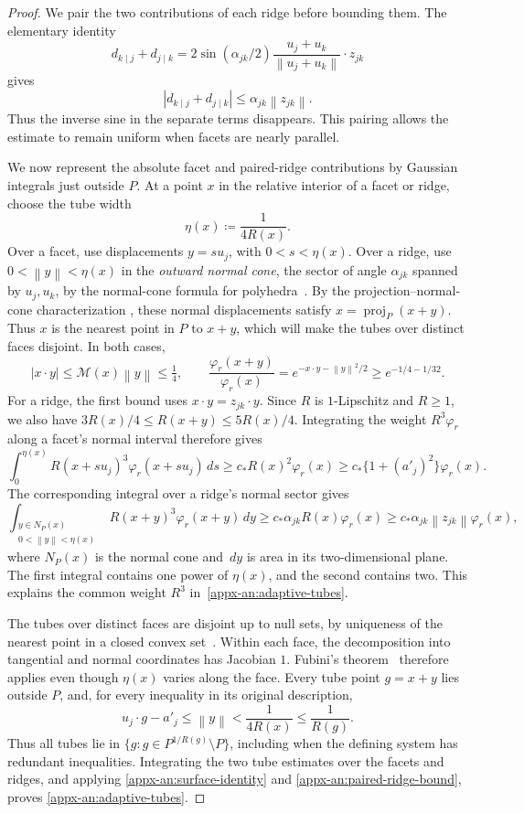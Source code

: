 \documentclass[11pt,letterpaper]{article}
\theoremstyle{remark}
\newcommand{\norm}[1]{\left\lVert#1\right\rVert}
\newcommand{\dd}{\,d}
\begin{document}
\begin{proof}
We pair the two contributions of each ridge before bounding them.
The elementary identity
\[
 d_{k\mid j}+d_{j\mid k}
 =2\sin(\alpha_{jk}/2)
       \frac{u_j+u_k}{\norm{u_j+u_k}}\cdot z_{jk}
\]
gives
\begin{equation}
 |d_{k\mid j}+d_{j\mid k}|\le\alpha_{jk}\norm{z_{jk}}.
 \label{appx-an:paired-ridge-bound}
\end{equation}
Thus the inverse sine in the separate terms disappears. This pairing
allows the estimate to remain uniform when facets are nearly parallel.

We now represent the absolute facet and paired-ridge contributions
by Gaussian integrals just outside \(P\). At a point \(x\) in the
relative interior of a facet or ridge, choose the tube width
\[
 \eta(x)\coloneqq \frac1{4R(x)}.
\]
Over a facet, use displacements \(y=s u_j\), with \(0<s<\eta(x)\).
Over a ridge, use \(0<\norm y<\eta(x)\) in the \emph{outward normal cone},
the sector of angle \(\alpha_{jk}\) spanned by \(u_j,u_k\), by the
normal-cone formula for polyhedra~\cite[Theorem~6.46]{RockafellarWets1998}.
By the projection--normal-cone characterization
\cite[Proposition~6.17]{RockafellarWets1998}, these normal displacements
satisfy \(x=\operatorname{proj}_P(x+y)\). Thus \(x\) is the nearest point
in \(P\) to \(x+y\), which will make the tubes over distinct faces
disjoint. In both cases,
\[
 |x\cdot y|\le\mathcal M(x)\norm y\le\tfrac14,\qquad
 \frac{\varphi_r(x+y)}{\varphi_r(x)}
       =e^{-x\cdot y-\norm y^2/2}\ge e^{-1/4-1/32}.
\]
For a ridge, the first bound uses \(x\cdot y=z_{jk}\cdot y\).
Since \(R\) is \(1\)-Lipschitz and \(R\ge1\), we also have
\(3R(x)/4\le R(x+y)\le5R(x)/4\).
Integrating the weight \(R^3\varphi_r\) along a facet's normal
interval therefore gives
\[
 \int_0^{\eta(x)} R(x+s u_j)^3\varphi_r(x+s u_j)\dd s
 \ge c_*R(x)^2\varphi_r(x)
 \ge c_*\{1+(a'_j)^2\}\varphi_r(x).
\]
The corresponding integral over a ridge's normal sector gives
\[
 \int_{\substack{y\in N_P(x)\\0<\norm y<\eta(x)}}
        R(x+y)^3\varphi_r(x+y)\dd y
 \ge c_*\alpha_{jk}R(x)\varphi_r(x)
 \ge c_*\alpha_{jk}\norm{z_{jk}}\varphi_r(x),
\]
where \(N_P(x)\) is the normal cone and \(\dd y\) is area in its
two-dimensional plane. The first integral contains one power of
\(\eta(x)\), and the second contains two. This explains the common weight
\(R^3\) in~\eqref{appx-an:adaptive-tubes}.

The tubes over distinct faces are disjoint up to null sets, by
uniqueness of the nearest point in a closed convex
set~\cite[Example~2.25]{RockafellarWets1998}. Within each
face, the decomposition into tangential and normal coordinates has
Jacobian \(1\). Fubini's theorem~\cite[Section~2.5]{Folland1999}
therefore applies even though
\(\eta(x)\) varies along the face. Every tube point \(g=x+y\) lies
outside \(P\), and, for every inequality in its original description,
\[
 u_j\cdot g-a'_j\le\norm y<\frac1{4R(x)}\le\frac1{R(g)}.
\]
Thus all tubes lie in \(\{g:g\in P^{1/R(g)}\setminus P\}\), including
when the defining system has redundant inequalities. Integrating the
two tube estimates over the facets and ridges, and applying
\eqref{appx-an:surface-identity} and
\eqref{appx-an:paired-ridge-bound}, proves
\eqref{appx-an:adaptive-tubes}.


\end{proof}
\end{document}
